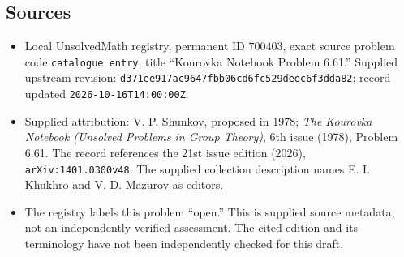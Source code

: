 \documentclass[11pt]{article}
\begin{document}
\subsection{Sources}
\begin{itemize}
\item Local UnsolvedMath registry, permanent ID \(700403\), exact source problem code \texttt{catalogue entry}, title ``Kourovka Notebook Problem 6.61.'' Supplied upstream revision: \texttt{d371ee917ac9647fbb06cd6fc529deec6f3dda82}; record updated \texttt{2026-10-16T14:00:00Z}.
\item Supplied attribution: V. P. Shunkov, proposed in 1978; \emph{The Kourovka Notebook (Unsolved Problems in Group Theory)}, 6th issue (1978), Problem 6.61. The record references the 21st issue edition (2026), \texttt{arXiv:1401.0300v48}. The supplied collection description names E. I. Khukhro and V. D. Mazurov as editors.
\item The registry labels this problem ``open.'' This is supplied source metadata, not an independently verified assessment. The cited edition and its terminology have not been independently checked for this draft.
\end{itemize}
\end{document}
